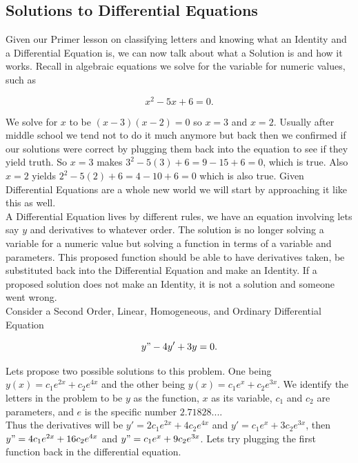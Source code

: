 \documentclass[12pt]{article}
\begin{document}
\subsection{Solutions to Differential Equations}

Given our Primer lesson on classifying letters and knowing what an Identity and a Differential Equation is, we can now talk about what a Solution is and how it works. Recall in algebraic equations we solve for the variable for numeric values, such as

\begin{equation*}
    x^2-5x+6=0.
\end{equation*}

We solve for $x$ to be $(x-3)(x-2)=0$ so $x=3$ and $x=2$. Usually after middle school we tend not to do it much anymore but back then we confirmed if our solutions were correct by plugging them back into the equation to see if they yield truth. So $x=3$ makes $3^2-5(3)+6=9-15+6=0$, which is true. Also $x=2$ yields $2^2-5(2)+6=4-10+6=0$ which is also true. Given Differential Equations are a whole new world we will start by approaching it like this as well. \\

A Differential Equation lives by different rules, we have an equation involving lets say $y$ and derivatives to whatever order. The solution is no longer solving a variable for a numeric value but solving a function in terms of a variable and parameters. This proposed function should be able to have derivatives taken, be substituted back into the Differential Equation and make an Identity. If a proposed solution does not make an Identity, it is not a solution and someone went wrong. \\

Consider a Second Order, Linear, Homogeneous, and Ordinary Differential Equation

\begin{equation*}
    y"-4y'+3y=0.
\end{equation*}

Lets propose two possible solutions to this problem. One being $y(x)=c_1e^{2x}+c_2e^{4x}$ and the other being $y(x)=c_1e^x+c_2e^{3x}$. We identify the letters in the problem to be $y$ as the function, $x$ as its variable, $c_1$ and $c_2$ are parameters, and $e$ is the specific number $2.71828...$. \\

Thus the derivatives will be $y'=2c_1e^{2x}+4c_2e^{4x}$ and $y'=c_1e^x+3c_2e^{3x}$, then $y"=4c_1e^{2x}+16c_2e^{4x}$ and $y"=c_1e^x+9c_2e^{3x}$. Lets try plugging the first function back in the differential equation.
\end{document}
